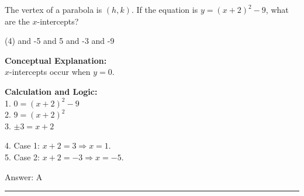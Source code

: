 \documentclass[11pt,paper=a4,answers]{exam}
\begin{document}
\begin{questions}
\vspace{30pt}

\question
The vertex of a parabola is $(h, k)$. If the equation is $y = (x + 2)^2 - 9$, what are the $x$-intercepts?
\begin{tasks}(4)
     and -5
     and 5
     and -3
     and -9
\end{tasks}

\begin{solution}
\textbf{Conceptual Explanation:} \\
$x$-intercepts occur when $y = 0$.

\vspace{15pt}

\textbf{Calculation and Logic:} \\
1. $0 = (x + 2)^2 - 9$ \\
2. $9 = (x + 2)^2$ \\
3. $\pm 3 = x + 2$

\vspace{10pt}

4. Case 1: $x + 2 = 3 \Rightarrow x = 1$. \\
5. Case 2: $x + 2 = -3 \Rightarrow x = -5$.

\vspace{20pt}

Answer: \colorbox{yellow!100}{A}
\end{solution}

\end{questions}
\begin{center}
\rule{.5\textwidth}{1pt}
\end{center}
\end{document}
